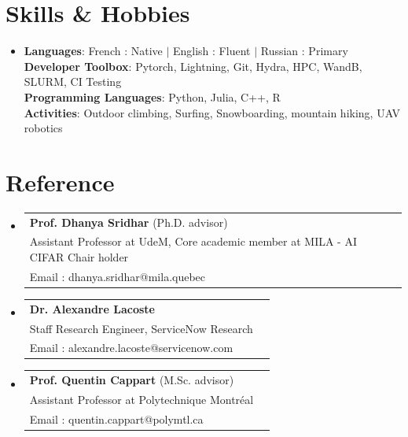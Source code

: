 \documentclass[letterpaper,11pt]{article}
\makeatletter
\newcommand{\resumeProjectHeading}[2]{
    \item
    \begin{tabular*}{0.97\textwidth}{l@{\extracolsep{\fill}}r}
      \small#1 & #2 \\
    \end{tabular*}\vspace{-7pt}
}
\newcommand{\resumeSubHeadingListStart}{\begin{itemize}[leftmargin=0.15in, label={}]}
\newcommand{\resumeSubHeadingListEnd}{\end{itemize}}
\makeatother
\begin{document}
\section{Skills \& Hobbies}
 \begin{itemize}[leftmargin=0.15in, label={}]
    \item{
    \textbf{Languages}{: French : Native $|$ English : Fluent $|$ Russian : Primary }} \\
     \textbf{Developer Toolbox}{: Pytorch, Lightning, Git, Hydra, HPC, WandB, SLURM, CI Testing} \\
     \textbf{Programming Languages}{: Python, Julia, C++, R} \\
    \vspace{10pt}
     \textbf{Activities}{: Outdoor climbing, Surfing, Snowboarding, mountain hiking, UAV robotics }
 \end{itemize}
\section{Reference}
 \resumeSubHeadingListStart
       \resumeProjectHeading
          {\textbf{Prof. Dhanya Sridhar}  (Ph.D. advisor)
            \\ Assistant Professor at UdeM, Core academic member at MILA - AI CIFAR Chair holder 
            \\ Email : dhanya.sridhar@mila.quebec}{}
       \resumeProjectHeading
          {\textbf{Dr. Alexandre Lacoste}
            \\ Staff Research Engineer, ServiceNow Research
            \\ Email : alexandre.lacoste@servicenow.com }{}
       \resumeProjectHeading
          {\textbf{Prof. Quentin Cappart}  (M.Sc. advisor)
\\ Assistant Professor at Polytechnique Montréal 
\\ Email : quentin.cappart@polymtl.ca }{}
    \resumeSubHeadingListEnd
\end{document}
